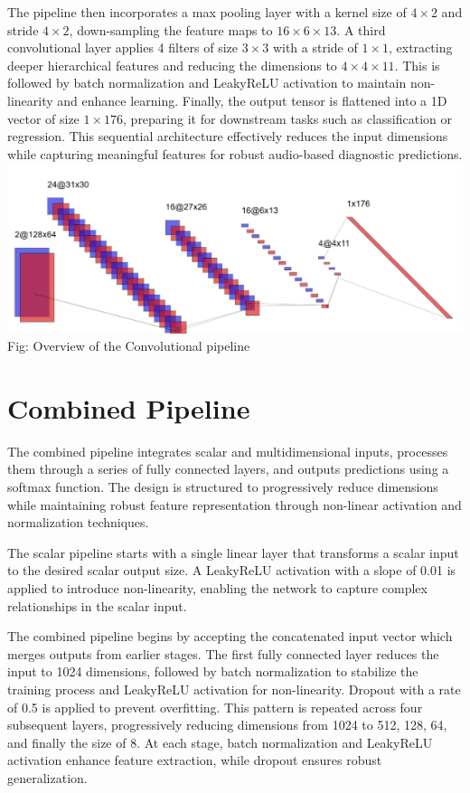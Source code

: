 \documentclass[twocolumn]{article}
\begin{document}
The pipeline then incorporates a max pooling layer with a kernel size of \(4 \times 2\) and stride \(4 \times 2\), down-sampling the feature maps to \(16 \times 6 \times 13\). A third convolutional layer applies 4 filters of size \(3 \times 3\) with a stride of \(1 \times 1\), extracting deeper hierarchical features and reducing the dimensions to \(4 \times 4 \times 11\). This is followed by batch normalization and LeakyReLU activation to maintain non-linearity and enhance learning. Finally, the output tensor is flattened into a 1D vector of size \(1 \times 176\), preparing it for downstream tasks such as classification or regression. This sequential architecture effectively reduces the input dimensions while capturing meaningful features for robust audio-based diagnostic predictions.
\includegraphics[scale=0.5]{Conv-Pipeline.png}
Fig: Overview of the Convolutional pipeline

\section{Combined Pipeline}

The combined pipeline integrates scalar and multidimensional inputs, processes them through a series of fully connected layers, and outputs predictions using a softmax function. The design is structured to progressively reduce dimensions while maintaining robust feature representation through non-linear activation and normalization techniques.

The scalar pipeline starts with a single linear layer that transforms a scalar input to the desired scalar output size. A LeakyReLU activation with a slope of 0.01 is applied to introduce non-linearity, enabling the network to capture complex relationships in the scalar input.

The combined pipeline begins by accepting the concatenated input vector which merges outputs from earlier stages. The first fully connected layer reduces the input to 1024 dimensions, followed by batch normalization to stabilize the training process and LeakyReLU activation for non-linearity. Dropout with a rate of 0.5 is applied to prevent overfitting. This pattern is repeated across four subsequent layers, progressively reducing dimensions from 1024 to 512, 128, 64, and finally the size of 8. At each stage, batch normalization and LeakyReLU activation enhance feature extraction, while dropout ensures robust generalization.
\end{document}
